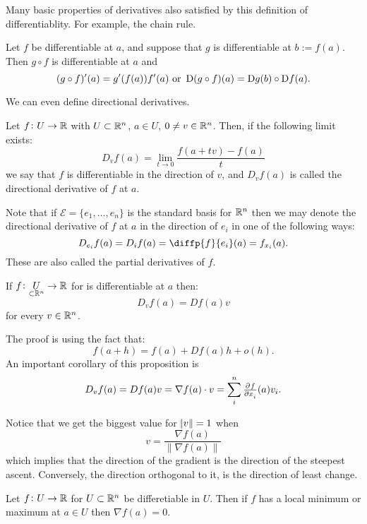 \documentclass[11pt,a4paper]{article}
\begin{document}
Many basic properties of derivatives also satisfied by this
definition of differentiablity.
For example, the chain rule.
\begin{proposition}
  Let $f$ be differentiable at $a$, and suppose that $g$ is differentiable
  at $b := f(a)$. Then $g \circ f$ is differentiable at $a$ and
  \[
    (g \circ f)'(a) = g'(f(a)) f'(a) \stor
    \Dif\, (g \circ f)(a) = \Dif g(b) \circ \Dif f(a).
  \]
\end{proposition}
We can even define directional derivatives.
\begin{definition}
  Let $f \colon U \to \mathbb{R}$ with $U \subset \mathbb{R}^n$, $a \in U$, $0 \neq v
  \in \mathbb{R}^n$. Then, if the following limit exists:
  \[
    D_v f(a) = \lim_{t \to 0}{\frac{f(a + tv) - f(a)}{t}}
  \]
  we say that $f$ is differentiable in the direction of $v$, and
  $D_v f(a)$ is called the directional derivative of $f$ at $a$.
\end{definition}

\begin{remark}
  Note that if $\mathcal{E} = \{e_1,\dots,e_n\}$ is the standard basis
  for $\mathbb{R}^n$ then we may denote the directional derivative of $f$ at $a$
  in the direction of $e_i$ in one of the following ways:
  \[
    D_{e_i} f(a) = D_i f(a) = \diffp{f}{{e_i}}(a) = 
    f_{x_i}(a).
  \]
  These are also called the partial derivatives of $f$.
\end{remark}

\begin{proposition}
  If $f \colon \underset{\subset \mathbb{R}^n}{U} \to \mathbb{R}$ for is differentiable 
  at $a$ then:
    \[
      D_v f(a) = D f(a) v
    \]	
  for every $v \in \mathbb{R}^n$.
\end{proposition} 
The proof is using the fact that:
\[
  f(a+h) = f(a) + Df(a)h + o(h).
\]
An important corollary of this proposition is
\[
  D_vf(a) = D f(a) v = \nabla f(a) \cdot v = 
  \sum_{i}^{n} \pd{f}{x_i}(a)v_i.
\]

\begin{remark}
  Notice that we get the biggest value for $\norm{v} = 1$ when
  \[
    v = \frac{\nabla f(a)}{\|\nabla f(a)\|}
  \]
  which implies that the direction
  of the gradient is the direction of the steepest ascent. Conversely,
  the direction orthogonal to it, is the direction of least change.
\end{remark}

\begin{proposition}
  Let $f \colon U \to \mathbb{R}$ for $U \subset \mathbb{R}^n$ be differetiable in $U$.
  Then if $f$ has a local minimum or maximum at $a \in U$ then
  $\nabla f(a) = 0$.
\end{proposition}
\end{document}
